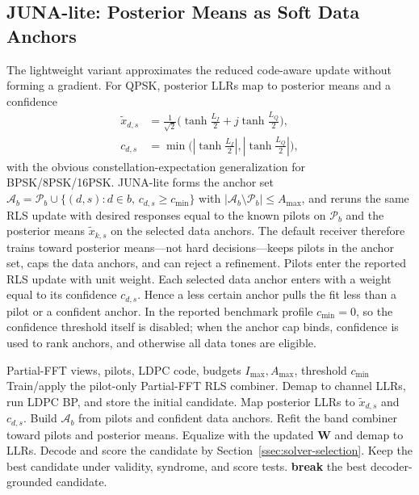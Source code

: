 \documentclass[journal]{IEEEtran}
\newcommand{\abs}[1]{\left\lvert #1 \right\rvert}
\newcommand{\junalite}{JUNA-lite}
\begin{document}
\subsection{\texorpdfstring{\junalite{}}{JUNA-lite}: Posterior Means as Soft Data
Anchors}\label{ssec:junalite}
The lightweight variant approximates the reduced code-aware update without
forming a gradient.
For QPSK, posterior LLRs map to posterior means and a confidence
\begin{equation}
  \begin{aligned}
  \widetilde x_{d,s}
    &=\tfrac{1}{\sqrt2}\big(\tanh\tfrac{L_{I}}{2}
      +j\tanh\tfrac{L_{Q}}{2}\big),\\
  c_{d,s}
    &=\min\!\big(\abs{\tanh\tfrac{L_{I}}{2}},
      \abs{\tanh\tfrac{L_{Q}}{2}}\big),
  \end{aligned}
  \label{eq:qpsk-posterior}
\end{equation}
with the obvious constellation-expectation generalization for BPSK/8PSK/16PSK.
\junalite{} forms the anchor set $\mathcal A_b=\mathcal P_b\cup\{(d,s):d\in b,\,
c_{d,s}\ge c_{\min}\}$ with $\abs{\mathcal A_b\setminus\mathcal P_b}\le A_{\max}$,
and reruns the same RLS update with desired responses equal to the known pilots
on $\mathcal P_b$ and the posterior means $\widetilde x_{k,s}$ on the selected
data anchors. The default receiver therefore trains toward posterior means---not
hard decisions---keeps pilots in the anchor set, caps the data anchors, and can
reject a refinement. Pilots enter the reported RLS update with unit weight.
Each selected data anchor enters with a weight equal to its confidence
$c_{d,s}$. Hence a less certain anchor pulls the fit less than a pilot or a
confident anchor. In the reported benchmark profile $c_{\min}=0$, so the
confidence threshold itself is disabled; when the anchor cap binds, confidence is
used to rank anchors, and otherwise all data tones are eligible.

\begin{algorithm}[t]
\caption{\junalite{} posterior-anchor RLS refinement}
\label{alg:junalite}
\footnotesize
\begin{algorithmic}[1]
\Require Partial-FFT views, pilots, LDPC code, budgets \(I_{\max},A_{\max}\),
  threshold \(c_{\min}\)
\State Train/apply the pilot-only Partial-FFT RLS combiner.
\State Demap to channel LLRs, run LDPC BP, and store the initial candidate.
  \State Map posterior LLRs to \(\widetilde x_{d,s}\) and \(c_{d,s}\).
    \State Build \(\mathcal A_b\) from pilots and confident data anchors.
    \State Refit the band combiner toward pilots and posterior means.
  \EndFor
  \State Equalize with the updated \(\mathbf W\) and demap to LLRs.
  \State Decode and score the candidate by Section~\ref{ssec:solver-selection}.
  \State Keep the best candidate under validity, syndrome, and score tests.
    \State \textbf{break}
  \EndIf
\EndFor
\State \Return the best decoder-grounded candidate.
\end{algorithmic}
\end{algorithm}
\end{document}
